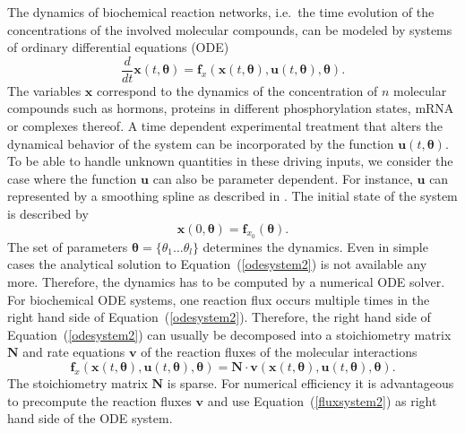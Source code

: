 \documentclass[12pt,a4paper]{scrartcl}
\newcommand{\DD}[2]{\frac{d #1}{d #2}}
\begin{document}
The dynamics of biochemical reaction networks, i.e.~the time evolution of the concentra\-tions of the involved molecular compounds, can be modeled by systems of ordinary differential equations (ODE)
\begin{equation}
	\DD{}{t}{\mathbf{x}}(t, \boldsymbol{\theta}) = \mathbf{f}_{x}(\mathbf{x}(t, \boldsymbol{\theta}), \mathbf{u}(t, \boldsymbol{\theta}), \boldsymbol{\theta}). \label{odesystem2}
\end{equation}
The variables $\mathbf{x}$ correspond to the dynamics of the concentration of $n$ molecular compounds such as hormons, proteins in different phosphorylation states, mRNA or complexes thereof. A time dependent experimental treatment that alters the dynamical behavior of the system can be incorporated by the function $\mathbf{u}(t, \boldsymbol{\theta})$. To be able to handle unknown quantities in these driving inputs, we consider the case where the function $\mathbf{u}$ can also be parameter dependent. For instance, $\mathbf{u}$ can represented by a smoothing spline as described in \citet{Schelker:2012uq}. The initial state of the system is described by 
\begin{equation}
	\mathbf{x}(0, \boldsymbol{\theta}) = \mathbf{f}_{x_0}(\boldsymbol{\theta}). \label{init_ode_sys}
\end{equation}	
The set of parameters $\boldsymbol{\theta} = \{\theta_1 \dots \theta_l\}$ determines the  dynamics. Even in simple cases the analytical solution to Equation~(\ref{odesystem2}) is not available any more. Therefore, the dynamics has to be computed by a numerical ODE solver. For biochemical ODE systems, one reaction flux occurs multiple times in the right hand side of Equation~(\ref{odesystem2}). Therefore, the right hand side of Equation~(\ref{odesystem2}) can usually be decomposed into a stoichiometry matrix $\mathbf{N}$ and rate equations $\mathbf{v}$ of the reaction fluxes of the molecular interactions
\begin{equation}
	\mathbf{f}_{x}(\mathbf{x}(t, \boldsymbol{\theta}), \mathbf{u}(t, \boldsymbol{\theta}), \boldsymbol{\theta}) = \mathbf{N} \cdot \mathbf{v}(\mathbf{x}(t, \boldsymbol{\theta}), \mathbf{u}(t, \boldsymbol{\theta}), \boldsymbol{\theta}). \label{fluxsystem2}
\end{equation}
The stoichiometry matrix $\mathbf{N}$ is sparse. For numerical efficiency it is advantageous to precompute the reaction fluxes $\mathbf{v}$ and use Equation~(\ref{fluxsystem2}) as right hand side of the ODE system. 
\end{document}
